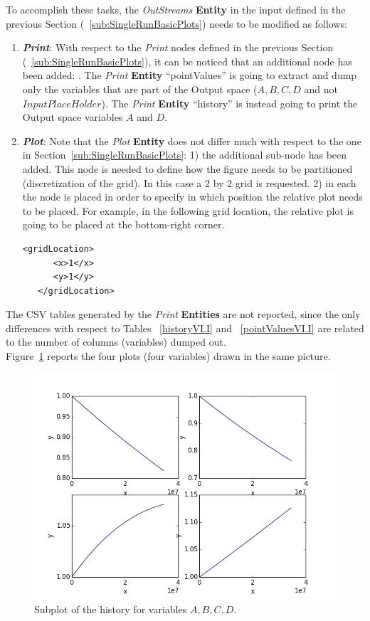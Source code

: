 To accomplish these tasks, the \textit{OutStreams} \textbf{Entity} in the input defined in the previous Section (~\ref{sub:SingleRunBasicPlots}) needs to be modified as follows:
\begin{enumerate}
   \item \textbf{\textit{Print}}:
   With respect to the \textit{Print} nodes defined in the previous Section (~\ref{sub:SingleRunBasicPlots}), it can
   be noticed that an additional node has been added: . The \textit{Print} \textbf{Entity}
   ``pointValues'' is going to extract and dump only the variables that are part of the Output space
   ($A,B,C,D$ and not $InputPlaceHolder$).  The \textit{Print} \textbf{Entity} ``history'' is instead going to print
   the Output space variables $A$ and $D$.

   \item \textbf{\textit{Plot}}:
 Note that the  \textit{Plot} \textbf{Entity} does not differ much with respect to the one in
 Section~\ref{sub:SingleRunBasicPlots}: 1) the additional sub-node   has been added.
 This node is needed to define how the figure needs to be partitioned (discretization of the grid). In this case
 a 2 by 2 grid is requested. 2) in each  the node  is placed in
 order to specify in which position the relative plot needs to be placed. For example, in the following grid
 location, the relative plot is going to be placed at the bottom-right corner.
  \begin{lstlisting}[style=XML,morekeywords={arg,extension,pauseAtEnd,overwrite}]
   <gridLocation>
      <x>1</x>
      <y>1</y>
   </gridLocation>
   \end{lstlisting}
 \end{enumerate}
The CSV tables generated by the \textit{Print} \textbf{Entities} are not reported, since the only differences with respect to Tables ~\ref{historyVI.I} and ~\ref{pointValuesVI.I} are related to the number of columns (variables)
dumped out.
\\Figure~\ref{fig:historySubPlotLine} reports the four plots (four variables) drawn in the same picture.
 \begin{figure}[h!]
  \centering
  \includegraphics[scale=0.7]{pics/1-historyPlot_line-line-line-line-subPlots.png}
  \caption{Subplot of the history for variables $A,B,C,D$.}
  \label{fig:historySubPlotLine}
 \end{figure}

